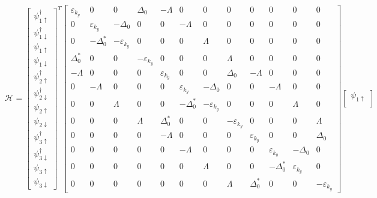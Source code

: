 \documentclass{jarticle}
\begin{document}
\begin{align}
\mathcal{H}=
\begin{bmatrix}
\psi_{1\uparrow}^\dagger \\ 
\psi_{1\downarrow}^\dagger \\ 
\psi_{1\uparrow} \\ 
\psi_{1\downarrow} \\ 
\psi_{2\uparrow}^\dagger \\ 
\psi_{2\downarrow}^\dagger \\ 
\psi_{2\uparrow} \\ 
\psi_{2\downarrow} \\ 
\psi_{3\uparrow}^\dagger \\ 
\psi_{3\downarrow}^\dagger \\ 
\psi_{3\uparrow} \\ 
\psi_{3\downarrow}
\end{bmatrix} 
^T
 \begin{bmatrix}
	\varepsilon_{k_y} & 0 & 0 & \Delta_0 & -\Lambda & 0 & 0 & 0 & 0 & 0 & 0 & 0 \\ 
	0 & \varepsilon_{k_y} & -\Delta_0 & 0 & 0 & -\Lambda & 0 & 0 & 0 & 0 & 0 & 0 \\ 
	0 & -\Delta_0^{*} & -\varepsilon_{k_y} & 0 & 0 & 0 & \Lambda & 0 & 0 & 0 & 0 & 0 \\ 
	\Delta_0^{*} & 0 & 0 & -\varepsilon_{k_y} & 0 & 0 & 0 & \Lambda & 0 & 0 & 0 & 0 \\ 
	-\Lambda & 0 & 0 & 0 & \varepsilon_{k_y} & 0 & 0 & \Delta_0 & -\Lambda & 0 & 0 & 0 \\ 
	0 & -\Lambda & 0 & 0 & 0 & \varepsilon_{k_y} & -\Delta_0 & 0 & 0 & -\Lambda & 0 & 0 \\ 
	0 & 0 & \Lambda & 0 & 0 & -\Delta_0^{*} & -\varepsilon_{k_y} & 0 & 0 & 0 & \Lambda & 0 \\ 
	0 & 0 & 0 & \Lambda & \Delta_0^{*} & 0 & 0 & -\varepsilon_{k_y} & 0 & 0 & 0 & \Lambda \\ 
	0 & 0 & 0 & 0 & -\Lambda & 0 & 0 & 0 & \varepsilon_{k_y} & 0 & 0 & \Delta_0 \\ 
	0 & 0 & 0 & 0 & 0 & -\Lambda & 0 & 0 & 0 & \varepsilon_{k_y} & -\Delta_0 & 0 \\ 
	0 & 0 & 0 & 0 & 0 & 0 & \Lambda & 0 & 0 & -\Delta_0^{*} & \varepsilon_{k_y} & 0 \\ 
	0 & 0 & 0 & 0 & 0 & 0 & 0 & \Lambda & \Delta_0^{*} & 0 & 0 & -\varepsilon_{k_y}
 \end{bmatrix} 
 \begin{bmatrix}
 \psi_{1\uparrow} \\ 

\end{bmatrix}
\end{align}
\end{document}
